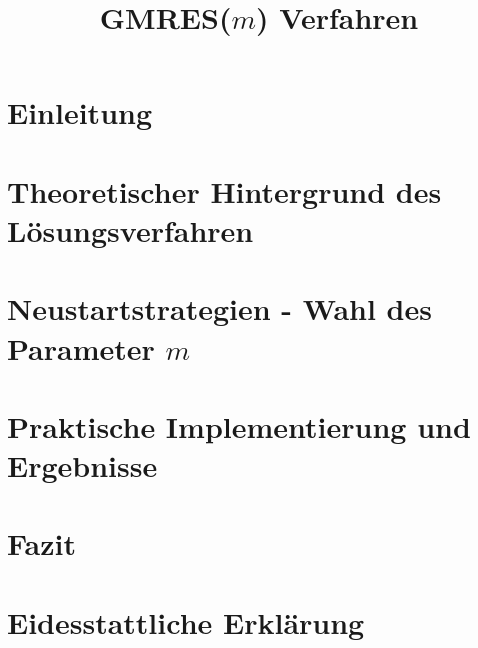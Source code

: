 \documentclass[11pt,a4paper]{scrbook}
\title{GMRES($m$) Verfahren}
\theoremstyle{definition}
\theoremstyle{plain}
\begin{document}
	
	\frontmatter
	
	
	
	
	\setcounter{page}{0}
	
	\tableofcontents
	
	
	\listoffigures
	\begingroup
	\let\clearpage\relax
	\listoftables
	
	\endgroup
	
	
	
	
	
	\renewcommand{\thechapter}{\Roman{chapter}}
	
	
	
	\mainmatter
	\setcounter{chapter}{0}
	\renewcommand{\thechapter}{\arabic{chapter}}
	
	\chapter{Einleitung}
	
	\chapter{Theoretischer Hintergrund des Lösungsverfahren}\label{chap:GMRES}

	\chapter{Neustartstrategien - Wahl des Parameter \texorpdfstring{$m$}{m}}\label{chap:RESTART}
	
	\chapter{Praktische Implementierung und Ergebnisse}\label{chap:RESULTS}
	
	\chapter{Fazit}\label{chap:SUMMARY}
	
	
	\chapter*{Eidesstattliche Erklärung}
	
	
\end{document}
